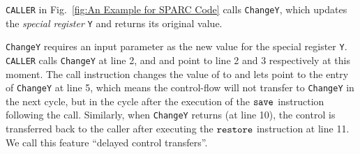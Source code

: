 \texttt{CALLER} in Fig.~\ref{fig:An Example for SPARC Code}
calls \texttt{ChangeY},
which updates the {\em special register} \texttt{Y}
and returns its original value.


\texttt{ChangeY} requires an input parameter
as the new value for the special register {\tt Y}.
\texttt{CALLER} calls \texttt{ChangeY} at line 2,
and \pc{} and \npc{} point to line 2 and 3 respectively at this
moment.
The call instruction changes the value of \pc{} to \npc{}
and lets \npc{} point to the entry of
\texttt{ChangeY} at line 5,
which means the control-flow will not transfer to \texttt{ChangeY}
in the next cycle,
but in the cycle after the execution of the $\texttt{save}$
instruction following the call. Similarly, when
\texttt{ChangeY} returns (at line 10), the control is transferred
back to the caller after executing the $\texttt{restore}$
instruction at line 11.
We call this feature ``delayed control transfers''.

